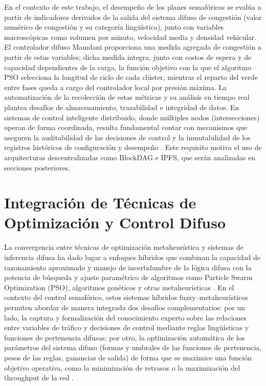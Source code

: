 En el contexto de este trabajo, el desempeño de los planes semafóricos se evalúa a partir de indicadores derivados de la salida del sistema difuso de congestión (valor numérico de congestión y su categoría lingüística), junto con variables macroscópicas como volumen por minuto, velocidad media y densidad vehicular. El controlador difuso Mamdani proporciona una medida agregada de congestión a partir de estas variables; dicha medida integra, junto con costos de espera y de capacidad dependientes de la carga, la función objetivo con la que el algoritmo PSO selecciona la longitud de ciclo de cada clúster, mientras el reparto del verde entre fases queda a cargo del controlador local por presión máxima. La automatización de la recolección de estas métricas y su análisis en tiempo real plantea desafíos de almacenamiento, trazabilidad e integridad de datos. En sistemas de control inteligente distribuido, donde múltiples nodos (intersecciones) operan de forma coordinada, resulta fundamental contar con mecanismos que aseguren la auditabilidad de las decisiones de control y la inmutabilidad de los registros históricos de configuración y desempeño \cite{singh2020blockchain,yuan2018blockchain}. Este requisito motiva el uso de arquitecturas descentralizadas como BlockDAG e IPFS, que serán analizadas en secciones posteriores.




\section{Integración de Técnicas de Optimización y Control Difuso}
\label{subsec:integracion_optimizacion_difuso}

La convergencia entre técnicas de optimización metaheurística y sistemas de inferencia difusa ha dado lugar a enfoques híbridos que combinan la capacidad de razonamiento aproximado y manejo de incertidumbre de la lógica difusa con la potencia de búsqueda y ajuste paramétrico de algoritmos como Particle Swarm Optimization (PSO), algoritmos genéticos y otras metaheurísticas \cite{papageorgiou2003review,dellorco2013harmony}. En el contexto del control semafórico, estos sistemas híbridos fuzzy--metaheurísticos permiten abordar de manera integrada dos desafíos complementarios: por un lado, la captura y formalización del conocimiento experto sobre las relaciones entre variables de tráfico y decisiones de control mediante reglas lingüísticas y funciones de pertenencia difusas; por otro, la optimización automática de los parámetros del sistema difuso (formas y umbrales de las funciones de pertenencia, pesos de las reglas, ganancias de salida) de forma que se maximice una función objetivo operativa, como la minimización de retrasos o la maximización del throughput de la red \cite{azimirad2010novel,yadav2021fuzzy}.

